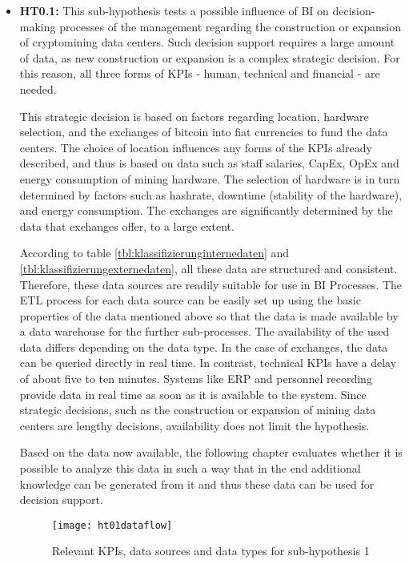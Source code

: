 \begin{itemize}
    \item \textbf{\ac{HT0.1}: }This sub-hypothesis tests a possible influence of \ac{BI} on decision-making processes of the
    management regarding the construction or expansion of cryptomining data centers. Such decision support requires
    a large amount of data, as new construction or expansion is a complex strategic decision. For this reason, all
    three forms of \acp{KPI} - human, technical and financial - are needed.
    
    This strategic decision is based on factors regarding location, hardware selection, and the
    exchanges of bitcoin into fiat currencies to fund the data centers. The choice of location influences
    any forms of the \acp{KPI} already described, and thus is based on data such as staff salaries, \ac{CapEx}, \ac{OpEx}
    and energy consumption of mining hardware. The selection of hardware is in turn determined by factors such as hashrate, downtime
    (stability of the hardware), and energy consumption. The exchanges are significantly determined by the data that exchanges
    offer, to a large extent.
    
    According to table \ref{tbl:klassifizierunginternedaten} and \ref{tbl:klassifizierungexternedaten}, all these data are
    structured and consistent. Therefore, these data sources are readily suitable for use in \ac{BI} Processes.
    The \ac{ETL} process for each data source can be easily set up using the basic properties of the data mentioned above
    so that the data is made available by a data warehouse for the further sub-processes. The availability
    of the used data differs depending on the data type. In the case of exchanges, the data can be queried directly in real time.
    In contrast, technical \acp{KPI} have a delay of about five to ten minutes.  Systems like
    \ac{ERP} and personnel recording provide data in real time as soon as it is available to the system. Since strategic decisions,
    such as the construction or expansion of mining data centers are lengthy decisions, availability does not limit the hypothesis.

    Based on the data now available, the following chapter evaluates whether it is possible to analyze this data
    in such a way that in the end additional knowledge can be generated from it and thus these data can be used for decision support.

    \begin{figure}[H]
        \caption{Relevant KPIs, data sources and data types for sub-hypothesis 1}
        \texttt{[image: ht01dataflow]}
        \label{figure:ht01dataflow}
    \end{figure}


\end{itemize}
